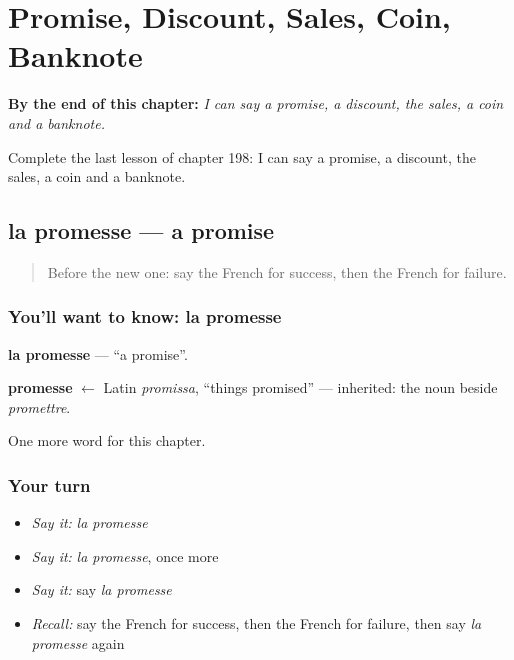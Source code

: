 
\chapter{Promise, Discount, Sales, Coin, Banknote}
\label{ch:fr-promise-discount-sales-coin-banknote}

\begin{chapteropening}
\textbf{By the end of this chapter:} \emph{I can say a promise, a discount, the sales, a coin and a banknote.}

Complete the last lesson of chapter 198: I can say a promise, a discount, the sales, a coin and a banknote.
\end{chapteropening}

\section[la promesse]{la promesse — a promise}

\label{lesson:FR-C198-promesse}



\begin{quote}
Before the new one: say the French for success, then the French for failure.
\end{quote}

\subsection*{You'll want to know: la promesse}
\textbf{la promesse} — \textquotedblleft{}a promise\textquotedblright{}.

\begin{cousinweb}
\textbf{promesse} $\leftarrow$ Latin \emph{promissa}, \textquotedblleft{}things promised\textquotedblright{} — inherited: the noun beside \emph{promettre}.
\end{cousinweb}

\begin{grammarlens}[title={What you've built}]
One more word for this chapter.
\end{grammarlens}

\subsection*{Your turn}
\begin{itemize}
\raggedright
  \item \emph{Say it:} \emph{la promesse}
  \item \emph{Say it:} \emph{la promesse}, once more
  \item \emph{Say it:} say \emph{la promesse}
  \item \emph{Recall:} say the French for success, then the French for failure, then say \emph{la promesse} again
\end{itemize}

